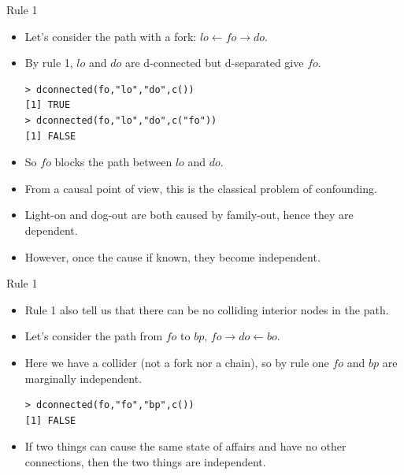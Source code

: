 \documentclass[handout]{beamer}
\begin{document}
\begin{frame}[fragile]{Rule 1}
\scriptsize{
\begin{itemize}

\item Let's consider the path with a fork: $lo \leftarrow fo \rightarrow do$.

\item By rule 1, $lo$ and $do$ are d-connected but d-separated give $fo$.

\begin{verbatim}
> dconnected(fo,"lo","do",c()) 
[1] TRUE
> dconnected(fo,"lo","do",c("fo")) 
[1] FALSE
\end{verbatim}


\item So $fo$ blocks the path between $lo$ and $do$.

\item From a causal point of view, this is the classical problem of confounding.

\item Light-on and dog-out are both caused by family-out, hence they are dependent.

\item However, once the cause if known, they become independent.





\end{itemize}

} 

\end{frame}


\begin{frame}[fragile]{Rule 1}
\scriptsize{
\begin{itemize}

\item Rule 1 also tell us that there can be no colliding interior nodes in the path.

\item Let's consider the path from $fo$ to $bp$, $fo \rightarrow do \leftarrow bo$.

\item Here we have a collider (not a fork nor a chain), so by rule one $fo$ and $bp$ are marginally independent.

\begin{verbatim}
> dconnected(fo,"fo","bp",c())
[1] FALSE 
\end{verbatim}



\item If two things can cause the same state of affairs and have no other connections, then the two things are independent.




\end{itemize}

} 

\end{frame}
\end{document}
